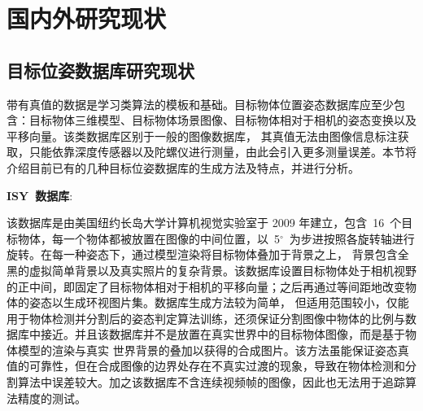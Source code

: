 \begin{comment}
Linux内核最初只是由芬兰人林纳斯·托瓦兹（Linus
Torvalds），见图\ref{fig:linus}，在赫尔辛基大学上学时出于
个人爱好而编写的，当时他并不满意~Minix~这个教学用的操作系统，部分因为只能在有限硬件上运行。
最初的设想中，Linux~是一种类似~Minix~这样的一种操作系统。Linux~的第一个版本在1991年9月
被大学~FTP server~管理员~Ari Lemmke~发布在~Internet~上，最初~Torvalds~称这个内核的名称为
~"Freax"，意思是自由（"free"）和奇异（"freak"）的结合字，并且
附上了~"X"~这个常用的字母，以配合所谓的~Unix-like~的系统。但是~FTP server~管理员
嫌原来的命名~“Freax”~的名称不好听，把内核的称呼改成~“Linux”~，当时仅有10000行代码，仍必须
运行于~Minix~操作系统之上，并且必须使用硬盘开机；随后在10月份第二个版本（0.02版）
就发布了，同时这位芬兰赫尔辛基的大学生在~comp.os.minix~上发布一则消息\par
\begin{center}
\fbox{\parbox[t]{0.8\textwidth}{
Hello everybody out there using minix-\\
I'm doing a (free) operation system (just a hobby,\\
won't be big and professional like gnu) for 386(486) AT clones.}}
\end{center}
\begin{figure}[htbp]
    \centering
    \texttt{[image: Linus\_Torvalds]}
    \caption{Linus Torvalds}
    \label{fig:linus}
\end{figure}
\end{comment}

\section{国内外研究现状}
\label{sec:status}

\subsection{目标位姿数据库研究现状}
\label{sec:databasestatus}
带有真值的数据是学习类算法的模板和基础。目标物体位置姿态数据库应至少包含：目标物体三维模型、目标物体场景图像、目标物体相对于相机的姿态变换以及平移向量。该类数据库区别于一般的图像数据库，
其真值无法由图像信息标注获取，只能依靠深度传感器以及陀螺仪进行测量，由此会引入更多测量误差。本节将介绍目前已有的几种目标位姿数据库的生成方法及特点，并进行分析。
\vskip0.2cm

\noindent\textbf{ISY~数据库}\cite{VikstenComparisonLocalImage2009}:

该数据库是由美国纽约长岛大学计算机视觉实验室于 2009 年建立，包含~16~个目标物体，每一个物体都被放置在图像的中间位置，以~5$^\circ$~为步进按照各旋转轴进行旋转。在每一种姿态下，通过模型渲染将目标物体叠加于背景之上，
背景包含全黑的虚拟简单背景以及真实照片的复杂背景。该数据库设置目标物体处于相机视野的正中间，即固定了目标物体相对于相机的平移向量；之后再通过等间距地改变物体的姿态以生成环视图片集。数据库生成方法较为简单，
但适用范围较小，仅能用于物体检测并分割后的姿态判定算法训练，还须保证分割图像中物体的比例与数据库中接近。并且该数据库并不是放置在真实世界中的目标物体图像，而是基于物体模型的渲染与真实
世界背景的叠加以获得的合成图片。该方法虽能保证姿态真值的可靠性，但在合成图像的边界处存在不真实过渡的现象，导致在物体检测和分割算法中误差较大。加之该数据库不含连续视频帧的图像，因此也无法用于追踪算法精度的测试。

